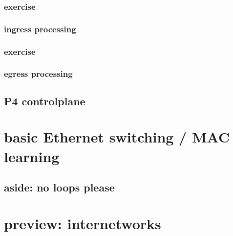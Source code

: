\subsubsection{exercise}

\subsubsection{ingress processing}

\subsubsection{exercise}

\subsubsection{egress processing}


\subsection{P4 controlplane}


\section{basic Ethernet switching / MAC learning}






\subsection{aside: no loops please}



\section{preview: internetworks}


